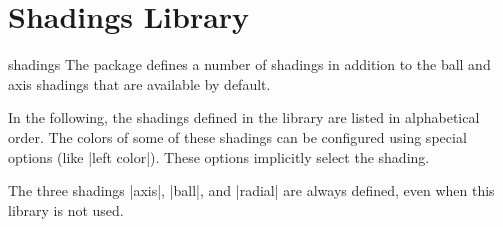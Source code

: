 %
%
%


\section[library-shadings]{Shadings Library}
\label{section-library-shadings}

\begin{pgflibrary}{shadings}
    The package defines a number of shadings in addition to the ball and axis
    shadings that are available by default.
\end{pgflibrary}

In the following, the shadings defined in the library are listed in
alphabetical order. The colors of some of these shadings can be configured
using special options (like |left color|). These options implicitly select the
shading.

The three shadings |axis|, |ball|, and |radial| are always defined, even when
this library is not used.


